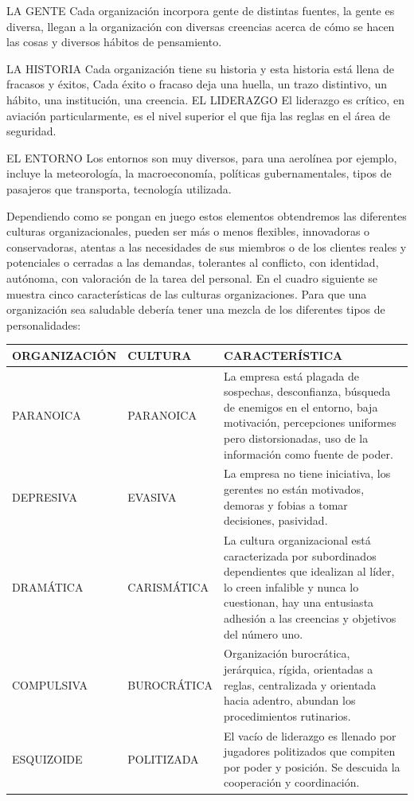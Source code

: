 LA GENTE Cada organización incorpora gente de distintas fuentes, la gente es diversa, llegan a la organización con diversas creencias acerca de cómo se hacen las cosas y diversos hábitos de pensamiento.

LA HISTORIA Cada organización tiene su historia y esta historia está llena de fracasos y éxitos, Cada éxito o fracaso deja una huella, un trazo distintivo, un hábito, una institución, una creencia. EL LIDERAZGO El liderazgo es crítico, en aviación particularmente, es el nivel superior el que fija las reglas en el área de seguridad.

EL ENTORNO Los entornos son muy diversos, para una aerolínea por ejemplo, incluye la meteorología, la macroeconomía, políticas gubernamentales, tipos de pasajeros que transporta, tecnología utilizada.



Dependiendo como se pongan en juego estos elementos obtendremos las diferentes culturas organizacionales, pueden ser más o menos flexibles, innovadoras o conservadoras, atentas a las necesidades de sus miembros o de los clientes reales y potenciales o cerradas a las demandas, tolerantes al conflicto, con identidad, autónoma, con valoración de la tarea del personal. En el cuadro siguiente se muestra cinco características de las culturas organizaciones. Para que una organización sea saludable debería tener una mezcla de los diferentes tipos de personalidades:


\begin{center}
\small
\begin{tabular}{|p{}|p{}|p{}|}
\hline
ORGANIZACIÓN & CULTURA & CARACTERÍSTICA \\ \hline
PARANOICA & PARANOICA & La empresa está plagada de sospechas, desconfianza, búsqueda de enemigos en el entorno, baja motivación, percepciones uniformes pero distorsionadas, uso de la información como fuente de poder. \\ \hline
DEPRESIVA & EVASIVA & La empresa no tiene iniciativa, los gerentes no están motivados, demoras y fobias a tomar decisiones, pasividad. \\ \hline
DRAMÁTICA & CARISMÁTICA & La cultura organizacional está caracterizada por subordinados dependientes que idealizan al líder, lo creen infalible y nunca lo cuestionan, hay una entusiasta adhesión a las creencias y objetivos del número uno. \\ \hline
COMPULSIVA & BUROCRÁTICA & Organización burocrática, jerárquica, rígida, orientadas a reglas, centralizada y orientada hacia adentro, abundan los procedimientos rutinarios. \\ \hline
ESQUIZOIDE & POLITIZADA & El vacío de liderazgo es llenado por jugadores politizados que compiten por poder y posición. Se descuida la cooperación y coordinación. \\ \hline
\end{tabular}
\end{center}

